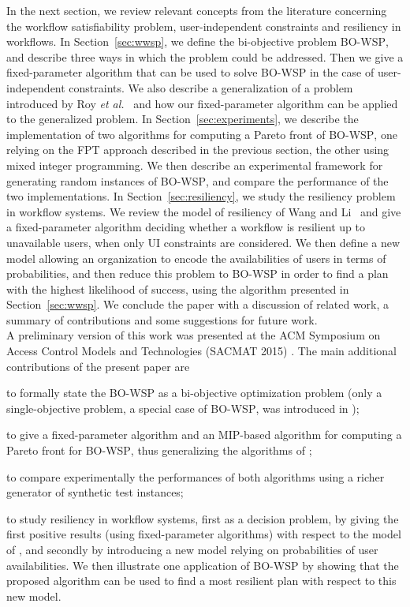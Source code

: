 \documentclass[jcs,crcready]{iosart1c}
\newcommand{\BOWSP}{\textsc{BO-WSP}\xspace}
\begin{document}
In the next section, we review relevant concepts from the literature concerning the workflow satisfiability problem, user-independent constraints and resiliency in workflows.
In Section~\ref{sec:wwsp}, we define the bi-objective problem \BOWSP, and describe three ways in which the problem could be addressed. 
Then we give a fixed-parameter algorithm that can be used to solve \BOWSP in the case of user-independent constraints. We also describe a generalization of a problem introduced by Roy {\em et al.}~\cite{Roy2015} and how our fixed-parameter algorithm can be applied to the generalized problem.
In Section~\ref{sec:experiments}, we describe the implementation of two algorithms for computing a Pareto front of \BOWSP, one relying on the FPT approach described in the previous section, the other using mixed integer programming. 
We then describe an experimental framework for generating random instances of \BOWSP, and compare the performance of the two implementations.
In Section~\ref{sec:resiliency}, we study the resiliency problem in workflow systems. We review the model of resiliency of Wang and Li~\cite{WaLi10} and give a fixed-parameter algorithm deciding whether a workflow is resilient up to  unavailable users, when only UI constraints are considered. We then define a new model allowing an organization to encode the availabilities of users in terms of probabilities, and then reduce this problem to \BOWSP in order to find a plan with the highest  likelihood of success, using the algorithm presented in Section~\ref{sec:wwsp}.
We conclude the paper with a discussion of related work, a summary of contributions and some suggestions for future work.\\

A preliminary version of this work was presented at the  ACM Symposium on Access Control Models and Technologies (SACMAT 2015) \cite{CrGuKa15}. The main additional contributions of the present paper are \begin{inparaenum}[(i)]\item to formally state the \BOWSP as a bi-objective optimization problem (only a single-objective problem, a special case of \BOWSP, was introduced in \cite{CrGuKa15});
 \item to give a fixed-parameter algorithm and an MIP-based algorithm for computing a Pareto front for \BOWSP, thus generalizing the algorithms of \cite{CrGuKa15};
\item to compare experimentally the performances of both algorithms using a richer generator of synthetic test instances;
 \item to study resiliency in workflow systems, first as a decision problem, by giving the first positive results (using fixed-parameter algorithms) with respect to the model of \cite{WaLi10}, and secondly by introducing a new model relying on probabilities of user availabilities. We then illustrate one application of \BOWSP by showing that the proposed algorithm can be used to find a most resilient plan with respect to this new model. 
\end{inparaenum}
\end{document}
